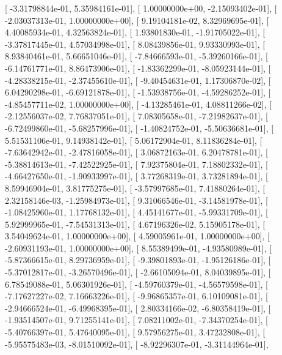 \documentclass{article}
\begin{document}
       [ -3.31798844e-01,   5.35984161e-01],
       [  1.00000000e+00,  -2.15093402e-01],
       [ -2.03037313e-01,   1.00000000e+00],
       [  9.19104181e-02,   8.32969695e-01],
       [  4.40085934e-01,   4.32563824e-01],
       [  1.93801830e-01,  -1.91705022e-01],
       [ -3.37817445e-01,   4.57034998e-01],
       [  8.08439856e-01,   9.93330993e-01],
       [  8.93840461e-01,   5.66651046e-01],
       [ -7.84666593e-01,  -5.39260166e-01],
       [ -6.14761771e-01,   8.86473906e-01],
       [ -1.83362299e-01,  -8.05923144e-01],
       [ -4.28338215e-01,  -2.37455610e-01],
       [ -9.40454631e-01,   1.17306870e-02],
       [  6.04290298e-01,  -6.69121878e-01],
       [ -1.53938756e-01,  -4.59286252e-01],
       [ -4.85457711e-02,   1.00000000e+00],
       [ -4.13285461e-01,   4.08811266e-02],
       [ -2.12556037e-02,   7.76837051e-01],
       [  7.08305658e-01,  -7.21982637e-01],
       [ -6.72499860e-01,  -5.68257996e-01],
       [ -1.40824752e-01,  -5.50636681e-01],
       [  5.51531106e-01,   9.14938142e-01],
       [  5.06172904e-01,   8.11836284e-01],
       [ -7.63642942e-01,  -2.47816058e-01],
       [  3.06872163e-01,   6.20478781e-01],
       [ -5.38814613e-01,  -7.42522925e-01],
       [  7.92375804e-01,   7.18802332e-01],
       [ -4.66427650e-01,  -1.90933997e-01],
       [  3.77268319e-01,   3.73281894e-01],
       [  8.59946904e-01,   3.81775275e-01],
       [ -3.57997685e-01,   7.41880264e-01],
       [  2.32158146e-03,  -1.25984973e-01],
       [  9.31066546e-01,  -3.14581978e-01],
       [ -1.08425960e-01,   1.17768132e-01],
       [  4.45141677e-01,  -5.99331709e-01],
       [  5.92999965e-01,  -7.54531313e-01],
       [  4.67196326e-02,   5.15905178e-01],
       [  3.54049624e-01,   1.00000000e+00],
       [  4.59005961e-01,   1.00000000e+00],
       [ -2.60931193e-01,   1.00000000e+00],
       [  8.55389499e-01,  -4.93580989e-01],
       [ -5.87366615e-01,   8.29736959e-01],
       [ -9.39801893e-01,  -1.95126186e-01],
       [ -5.37012817e-01,  -3.26570496e-01],
       [ -2.66105094e-01,   8.04039895e-01],
       [  6.78549088e-01,   5.06301926e-01],
       [ -4.59760379e-01,  -4.56579598e-01],
       [ -7.17627227e-02,   7.16663226e-01],
       [ -9.96865357e-01,   6.10109081e-01],
       [ -2.94666524e-01,  -6.49968395e-01],
       [  2.80334166e-02,  -6.80358419e-01],
       [ -1.93514507e-01,   9.71255141e-01],
       [  7.08211002e-01,  -7.34370254e-01],
       [ -5.40766397e-01,   5.47640095e-01],
       [  9.57956275e-01,   3.47232808e-01],
       [ -5.95575483e-03,  -8.01510092e-01],
       [ -8.92296307e-01,  -3.31144964e-01],
\end{document}

